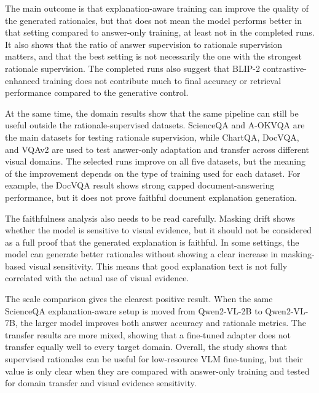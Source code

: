 \documentclass[12pt,bibliography=totoc,listof=totoc,BCOR=5mm,DIV=12,oneside,open=any]{scrbook}
\begin{document}
The main outcome is that explanation-aware training can improve the quality of the generated rationales, but that does not mean the model performs better in that setting compared to answer-only training, at least not in the completed runs.
It also shows that the ratio of answer supervision to rationale supervision matters, and that the best setting is not necessarily the one with the strongest rationale supervision.
The completed runs also suggest that BLIP-2 contrastive-enhanced training does not contribute much to final accuracy or retrieval performance compared to the generative control.

At the same time, the domain results show that the same pipeline can still be useful outside the rationale-supervised datasets.
ScienceQA and A-OKVQA are the main datasets for testing rationale supervision, while ChartQA, DocVQA, and VQAv2 are used to test answer-only adaptation and transfer across different visual domains.
The selected runs improve on all five datasets, but the meaning of the improvement depends on the type of training used for each dataset.
For example, the DocVQA result shows strong capped document-answering performance, but it does not prove faithful document explanation generation.

The faithfulness analysis also needs to be read carefully.
Masking drift shows whether the model is sensitive to visual evidence, but it should not be considered as a full proof that the generated explanation is faithful.
In some settings, the model can generate better rationales without showing a clear increase in masking-based visual sensitivity.
This means that good explanation text is not fully correlated with the actual use of visual evidence.

The scale comparison gives the clearest positive result.
When the same ScienceQA explanation-aware setup is moved from Qwen2-VL-2B to Qwen2-VL-7B, the larger model improves both answer accuracy and rationale metrics.
The transfer results are more mixed, showing that a fine-tuned adapter does not transfer equally well to every target domain.
Overall, the study shows that supervised rationales can be useful for low-resource VLM fine-tuning, but their value is only clear when they are compared with answer-only training and tested for domain transfer and visual evidence sensitivity.
\end{document}
